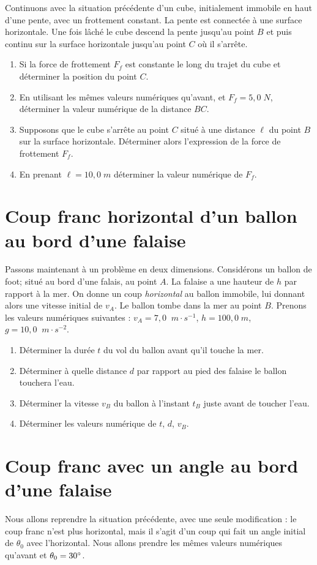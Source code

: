 \documentclass[11pt,a4paper]{article}
\newcommand{\mps}{\; m\cdot s^{-1}}
\newcommand{\mpss}{\; m\cdot s^{-2}}
\begin{document}
Continuons avec la situation précédente d'un cube, initialement immobile en haut d'une pente, avec un frottement constant. 
La pente est connectée à une surface horizontale. Une fois lâché le cube descend la pente jusqu'au point $B$ et puis continu sur la surface horizontale jusqu'au point $C$ où il s'arrête. 

\begin{enumerate}
    \item Si la force de frottement $F_f$ est constante le long du trajet du cube et déterminer la position du point $C$.
    \item En utilisant les mêmes valeurs numériques qu'avant, et $F_f=5,0\; N$, déterminer la valeur numérique de la distance $BC$. 
    \item Supposons que le cube s'arrête au point $C$ situé à une distance $\ell$ du point $B$ sur la surface horizontale. Déterminer alors l'expression de la force de frottement $F_f$. 
    \item En prenant $\ell=10,0\; m$ déterminer la valeur numérique de $F_f$. 
\end{enumerate}

\section{Coup franc horizontal d'un ballon au bord d'une falaise}
Passons maintenant à un problème en deux dimensions. 
Considérons un ballon de foot; situé au bord d'une falais, au point $A$. La falaise a une hauteur de $h$ par rapport à la mer. 
On donne un coup \textit{horizontal} au ballon immobile, lui donnant alors une vitesse initial de $v_A$. Le ballon tombe dans la mer au point $B$. Prenons les valeurs numériques suivantes : $v_A=7,0\; \mps $, $h=100,0 \; m$, $g=10,0 \; \mpss$.  
\begin{enumerate}
    \item Déterminer la durée $t$ du vol du ballon avant qu'il touche la mer. 
    \item Déterminer à quelle distance $d$ par rapport au pied des falaise le ballon touchera l'eau. 
    \item Déterminer la vitesse $v_B$ du ballon à l'instant $t_B$ juste avant de toucher l'eau.
    \item Déterminer les valeurs numérique de $t$, $d$, $v_B$. 
\end{enumerate}

\section{Coup franc avec un angle au bord d'une falaise}
Nous allons reprendre la situation précédente, avec une seule modification : le coup franc n'est plus horizontal, mais il s'agit d'un coup qui fait un angle initial de $\theta_0$ avec l'horizontal. 
Nous allons prendre les mêmes valeurs numériques qu'avant et $\theta_0=30\degree$. 
\end{document}
